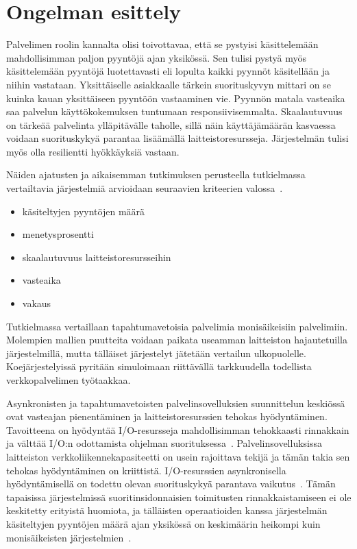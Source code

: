 \documentclass[12pt]{article}
\begin{document}
\section{}
\section{Ongelman esittely}

Palvelimen roolin kannalta olisi toivottavaa, että
se pystyisi käsittelemään mahdollisimman paljon pyyntöjä
ajan yksikössä. Sen tulisi pystyä myös käsittelemään pyyntöjä
luotettavasti eli lopulta kaikki pyynnöt käsitellään ja niihin vastataan.
Yksittäiselle asiakkaalle tärkein suorituskyvyn mittari on se kuinka kauan
yksittäiseen pyyntöön vastaaminen vie. Pyynnön matala vasteaika saa
palvelun käyttökokemuksen tuntumaan responsiivisemmalta.
Skaalautuvuus on tärkeää palvelinta ylläpitävälle taholle, sillä 
näin käyttäjämäärän kasvaessa voidaan suorituskykyä parantaa
lisäämällä laitteistoresursseja. Järjestelmän tulisi myös
olla resilientti hyökkäyksiä vastaan.

Näiden ajatusten ja aikaisemman tutkimuksen perusteella
tutkielmassa vertailtavia järjestelmiä arvioidaan seuraavien 
kriteerien valossa~\cite{gokhale_performance_2006}.
\begin{itemize}
    \item käsiteltyjen pyyntöjen määrä
    \item menetysprosentti
    \item skaalautuvuus laitteistoresursseihin
    \item vasteaika
    \item vakaus
\end{itemize}
Tutkielmassa vertaillaan tapahtumavetoisia palvelimia monisäikeisiin palvelimiin.
Molempien mallien puutteita voidaan paikata useamman laitteiston hajautetuilla 
järjestelmillä, mutta tälläiset järjestelyt jätetään vertailun ulkopuolelle.
Koejärjestelyissä pyritään simuloimaan riittävällä tarkkuudella todellista
verkkopalvelimen työtaakkaa.

Asynkronisten ja tapahtumavetoisten palvelinsovelluksien suunnittelun keskiössä
ovat vasteajan pienentäminen ja laitteistoresurssien tehokas hyödyntäminen. 
Tavoitteena on hyödyntää I/O-resursseja mahdollisimman tehokkaasti
rinnakkain ja välttää I/O:n odottamista ohjelman suorituksessa~\cite{pai_flash:_nodate}. Palvelinsovelluksissa
laitteiston verkkoliikennekapasiteetti on usein rajoittava tekijä ja tämän takia
sen tehokas hyödyntäminen on kriittistä. I/O-resurssien asynkronisella hyödyntämisellä on todettu
olevan suorituskykyä parantava vaikutus~\cite{hu_applying_1998}.
Tämän tapaisissa järjestelmissä suoritinsidonnaisien
toimitusten rinnakkaistamiseen ei ole keskitetty erityistä huomiota, ja tälläisten operaatioiden
kanssa järjestelmän käsiteltyjen pyyntöjen määrä ajan yksikössä on keskimäärin heikompi
kuin monisäikeisten järjestelmien~\cite{davis_case_2017}.
\end{document}
